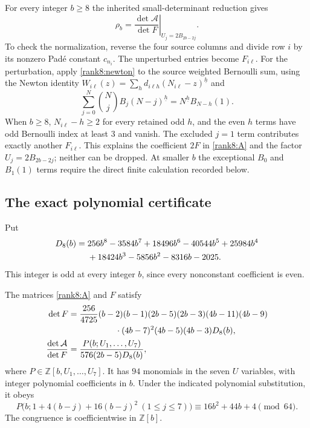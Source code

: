 For every integer $b\ge8$ the inherited small-determinant reduction
gives
\begin{equation}\label{rank8:ratio-small}
 \rho_b=
 \left.\frac{\det\mathcal A}{\det F}
 \right|_{U_j=2B_{2b-2j}}.
\end{equation}
To check the normalization, reverse the four source columns and
divide row $i$ by its nonzero Pad\'e constant $c_{n_i}$.  The
unperturbed entries become $F_{i\ell}$.  For the perturbation, apply
\eqref{rank8:newton} to the source weighted Bernoulli sum, using
the Newton identity
$W_{i\ell}(z)=\sum_h d_{i\ell h}(N_{i\ell}-z)^{\underline h}$
and
\[
 \sum_{j=0}^{N}\binom Nj B_j(N-j)^{\underline h}
      =N^{\underline h}B_{N-h}(1).
\]
When $b\ge8$, $N_{i\ell}-h\ge2$ for every retained odd $h$, and
the even $h$ terms have odd Bernoulli index at least $3$ and vanish.
The excluded $j=1$ term contributes exactly another $F_{i\ell}$.
This explains the coefficient $2F$ in \eqref{rank8:A} and the factor
$U_j=2B_{2b-2j}$; neither can be dropped.  At smaller $b$ the
exceptional $B_0$ and $B_1(1)$ terms require the direct finite
calculation recorded below.

\subsection{The exact polynomial certificate}

Put
\begin{align}
 D_8(b)={}&256b^8-3584b^7+18496b^6-40544b^5
 +25984b^4\notag\\
 &+18424b^3-5856b^2-8316b-2025.
 \label{rank8:D8}
\end{align}
This integer is odd at every integer $b$, since every nonconstant
coefficient is even.

\begin{lemma}\label{rank8:certificate}
The matrices \eqref{rank8:A} and $F$ satisfy
\begin{align}
 \det F={}&\frac{256}{4725}(b-2)(b-1)(2b-5)(2b-3)
 (4b-11)(4b-9)\notag\\
 &\hspace{15mm}\cdot(4b-7)^2(4b-5)(4b-3)D_8(b),
 \label{rank8:Fdet}\\
 \frac{\det\mathcal A}{\det F}
   ={}&\frac{P(b;U_1,\ldots,U_7)}{576(2b-5)D_8(b)},
 \label{rank8:certificate-ratio}
\end{align}
where $P\in\mathbb Z[b,U_1,\ldots,U_7]$.  It has $94$ monomials
in the seven $U$ variables, with integer polynomial coefficients in
$b$.  Under the indicated polynomial substitution, it obeys
\begin{equation}\label{rank8:congruence-certificate}
 \boxed{P\bigl(b;1+4(b-j)+16(b-j)^2\ (1\le j\le7)\bigr)
       \equiv16b^2+44b+4\pmod {64}.}
\end{equation}
The congruence is coefficientwise in $\mathbb Z[b]$.
\end{lemma}

